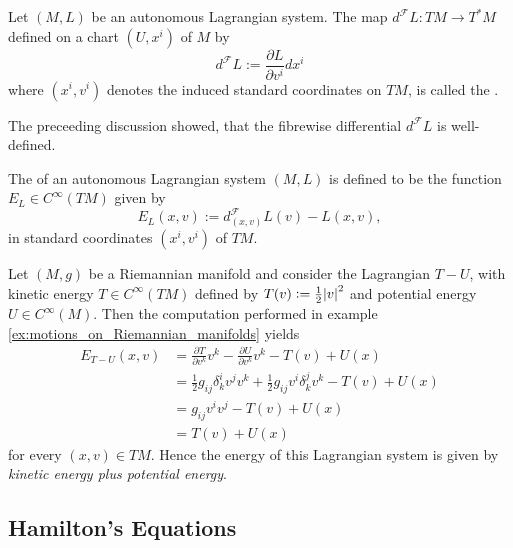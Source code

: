 \begin{definition}
	Let $(M,L)$ be an autonomous Lagrangian system. The map $d^\mathcal{F}L : TM \to T^*M$ defined on a chart $(U,x^i)$ of $M$ by
	\begin{equation}
		\label{eq:fibrewise_differential}
		d^\mathcal{F}L := \frac{\partial L}{\partial v^i}dx^i
	\end{equation}
	\noindent where $(x^i,v^i)$ denotes the induced standard coordinates on $TM$, is called the .
\end{definition}

\begin{remark}
	The preceeding discussion showed, that the fibrewise differential $d^\mathcal{F}L$ is well-defined.
\end{remark}

\begin{definition}[Energy]
	The  of an autonomous Lagrangian system $(M,L)$ is defined to be the function $E_L \in C^\infty(TM)$ given by
	\begin{equation*}
		E_L(x,v) := d^\mathcal{F}_{(x,v)}L(v) - L(x,v),
	\end{equation*}
	\noindent in standard coordinates $(x^i,v^i)$ of $TM$.
\end{definition}

\begin{example}
	Let $(M,g)$ be a Riemannian manifold and consider the Lagrangian $T - U$, with kinetic energy $T \in C^\infty(TM)$ defined by $T(v) := \frac{1}{2}\abs{v}^2$ and potential energy $U \in C^\infty(M)$. Then the computation performed in example \ref{ex:motions_on_Riemannian_manifolds} yields
	\begin{align*}
		E_{T - U}(x,v) &= \frac{\partial T}{\partial v^k}v^k - \frac{\partial U}{\partial v^k}v^k - T(v) + U(x)\\
		&= \frac{1}{2}g_{ij}\delta^i_k v^jv^k + \frac{1}{2}g_{ij}v^i \delta^j_k v^k - T(v) + U(x)\\
		&= g_{ij}v^i v^j - T(v) + U(x)\\
		&= T(v) + U(x)
	\end{align*}
	\noindent for every $(x,v) \in TM$. Hence the energy of this Lagrangian system is given by \emph{kinetic energy plus potential energy}.
\end{example}

\subsection*{Hamilton's Equations}

